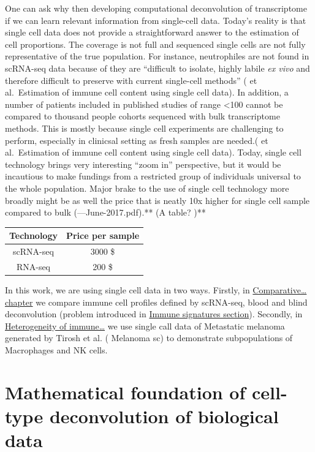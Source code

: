 \documentclass[12pt,]{book}
\theoremstyle{definition}
\theoremstyle{definition}
\theoremstyle{definition}
\theoremstyle{remark}
\begin{document}
One can ask why then developing computational deconvolution of
transcriptome if we can learn relevant information from single-cell
data. Today's reality is that single cell data does not provide a
straightforward answer to the estimation of cell proportions. The
coverage is not full and sequenced single cells are not fully
representative of the true population. For instance, neutrophiles are
not found in scRNA-seq data because of they are ``difficult to isolate,
highly labile \emph{ex vivo} and therefore difficult to preserve with
current single-cell methods'' (\citet{Shelker} et al.~Estimation of
immune cell content using single cell data). In addition, a number of
patients included in published studies of range \textless{}100 cannot be
compared to thousand people cohorts sequenced with bulk transcriptome
methods. This is mostly because single cell experiments are challenging
to perform, especially in clinicsal setting as fresh samples are
needed.(\citet{Shelker} et al.~Estimation of immune cell content using
single cell data). Today, single cell technology brings very interesting
``zoom in'' perspective, but it would be incautious to make fundings
from a restricted group of individuals universal to the whole
population. Major brake to the use of single cell technology more
broadly might be as well the price that is neatly 10x higher for single
cell sample compared to bulk
(\citet{https://www.cedars-sinai.edu/Research/Research-Cores/Genomics-Core/Documents/Single-Cell-Genomics-Pricing}---June-2017.pdf).**
(A table? )**

\begin{longtable}[]{@{}cc@{}}
\toprule
Technology & Price per sample\tabularnewline
\midrule
\endhead
scRNA-seq & 3000 \$\tabularnewline
RNA-seq & 200 \$\tabularnewline
\bottomrule
\end{longtable}

In this work, we are using single cell data in two ways. Firstly, in
\protect\hyperlink{results}{Comparative\ldots{} chapter} we compare
immune cell profiles defined by scRNA-seq, blood and blind deconvolution
(problem introduced in \protect\hyperlink{immune-signatures}{Immune
signatures section}). Secondly, in \protect\hyperlink{map}{Heterogeneity
of immune\ldots{}} we use single call data of Metastatic melanoma
generated by Tirosh et al. (\citet{Tirosh} Melanoma sc) to demonstrate
subpopulations of Macrophages and NK cells.

\hypertarget{methods}{%
\chapter{Mathematical foundation of cell-type deconvolution of
biological data}\label{methods}}
\end{document}
